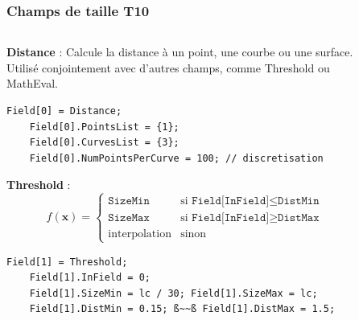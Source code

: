 \documentclass[aspectratio=169]{beamer}
\begin{document}
\begin{frame}[fragile]
\frametitle{Champs de taille \hfill T10}
\begin{columns}
  \begin{column}{0.65\textwidth}
    \footnotesize
    \textbf{Distance} : Calcule la distance à un point, une courbe ou une surface. Utilisé conjointement avec d'autres champs, comme Threshold ou MathEval.
    \begin{lstlisting}[frame=none,aboveskip=2mm,belowskip=1mm]
    Field[0] = Distance;
    Field[0].PointsList = {1};
    Field[0].CurvesList = {3};
    Field[0].NumPointsPerCurve = 100; // discretisation
    \end{lstlisting}
    \textbf{Threshold} :
    \vspace{-0.6cm}
    \begin{equation*}
      f(\mathbf{x}) =
        \begin{cases}
          \texttt{SizeMin} & \text{si } \texttt{Field[InField]} \leq \texttt{DistMin}\\
          \texttt{SizeMax} & \text{si } \texttt{Field[InField]} \geq \texttt{DistMax}\\
          \text{interpolation} & \text{sinon}
        \end{cases}
    \end{equation*}
    \begin{lstlisting}[frame=none,aboveskip=0mm,belowskip=0mm,escapechar=ß]
    Field[1] = Threshold;
    Field[1].InField = 0;
    Field[1].SizeMin = lc / 30; Field[1].SizeMax = lc;
    Field[1].DistMin = 0.15; ß~~ß Field[1].DistMax = 1.5;
    \end{lstlisting}
  \end{column}
  \begin{column}{0.35\textwidth}
    \vspace{1cm}
    \begin{figure}

\end{figure}
\end{column}
\end{columns}
\end{frame}
\end{document}
